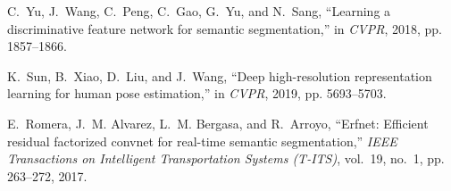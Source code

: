 \documentclass[10.5pt,twocolumn,journal,letterpaper]{IEEEtran}
\begin{document}
\begin{thebibliography}{10}
	C.~Yu, J.~Wang, C.~Peng, C.~Gao, G.~Yu, and N.~Sang, ``Learning a
	discriminative feature network for semantic segmentation,'' in \emph{CVPR},
	2018, pp. 1857--1866.
	
	K.~Sun, B.~Xiao, D.~Liu, and J.~Wang, ``Deep high-resolution representation
	learning for human pose estimation,'' in \emph{CVPR}, 2019, pp. 5693--5703.
	
	E.~Romera, J.~M. Alvarez, L.~M. Bergasa, and R.~Arroyo, ``Erfnet: Efficient
	residual factorized convnet for real-time semantic segmentation,'' \emph{IEEE
		Transactions on Intelligent Transportation Systems (T-ITS)}, vol.~19, no.~1,
	pp. 263--272, 2017.
	
\end{thebibliography}



\ifCLASSOPTIONcaptionsoff
  \newpage
\fi
\end{document}
